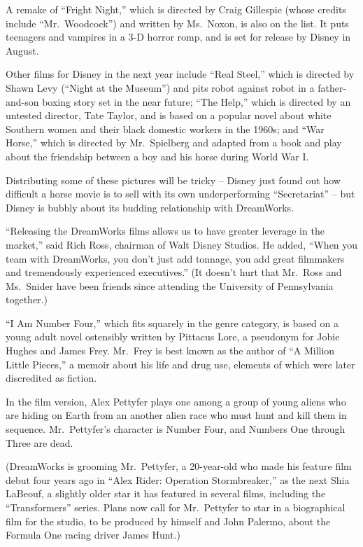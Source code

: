 ﻿\documentclass[12pt]{article}
\begin{document}
A remake of ``Fright Night,'' which is directed by Craig Gillespie (whose credits include
``Mr.~Woodcock'') and written by Ms.~Noxon, is also on the list. It puts teenagers and vampires in a
3-D horror romp, and is set for release by Disney in August.

Other films for Disney in the next year include ``Real Steel,'' which is directed by Shawn Levy
(``Night at the Museum'') and pits robot against robot in a father-and-son boxing story set in the
near future; ``The Help,'' which is directed by an untested director, Tate Taylor, and is based on a
popular novel about white Southern women and their black domestic workers in the 1960s; and ``War
Horse,'' which is directed by Mr.~Spielberg and adapted from a book and play about the friendship
between a boy and his horse during World War I.

Distributing some of these pictures will be tricky -- Disney just found out how difficult a horse
movie is to sell with its own underperforming ``Secretariat'' -- but Disney is bubbly about its
budding relationship with DreamWorks.

``Releasing the DreamWorks films allows us to have greater leverage in the market,'' said Rich Ross,
chairman of Walt Disney Studios. He added, ``When you team with DreamWorks, you don't just add
tonnage, you add great filmmakers and tremendously experienced executives.'' (It doesn't hurt that
Mr.~Ross and Ms.~Snider have been friends since attending the University of Pennsylvania together.)

``I Am Number Four,'' which fits squarely in the genre category, is based on a young adult novel
ostensibly written by Pittacus Lore, a pseudonym for Jobie Hughes and James Frey. Mr.~Frey is best
known as the author of ``A Million Little Pieces,'' a memoir about his life and drug use, elements
of which were later discredited as fiction.

In the film version, Alex Pettyfer plays one among a group of young aliens who are hiding on Earth
from an another alien race who must hunt and kill them in sequence. Mr.~Pettyfer's character is
Number Four, and Numbers One through Three are dead.

(DreamWorks is grooming Mr.~Pettyfer, a 20-year-old who made his feature film debut four years ago
in ``Alex Rider: Operation Stormbreaker,'' as the next Shia LaBeouf, a slightly older star it has
featured in several films, including the ``Transformers'' series. Plans now call for Mr.~Pettyfer to
star in a biographical film for the studio, to be produced by himself and John Palermo, about the
Formula One racing driver James Hunt.)
\end{document}
